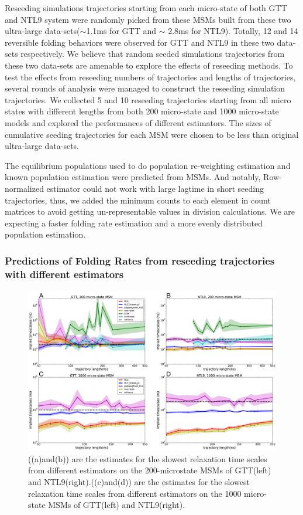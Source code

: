 \documentclass[%
 aip,
rsi,%
 amsmath,amssymb,
 reprint,%
]{revtex4-1}
\begin{document}
Reseeding simulations trajectories  starting from each micro-state of both GTT and NTL9 system were randomly picked from these MSMs built from these two ultra-large data-sets($\sim$1.1ms for GTT and $\sim$ 2.8ms for NTL9). Totally, 12 and 14 reversible folding behaviors were observed for GTT and NTL9 in these two data-sets respectively\cite{LindorffLarsen:2011gla}. We believe that random seeded simulations trajectories from these two data-sets are amenable to explore the effects of reseeding methods. To test the effects from reseeding numbers of trajectories and lengths of trajectories, several rounds of analysis were managed to construct the reseeding simulation trajectories. We collected 5 and 10 reseeding trajectories starting from all micro states with different lengths from both 200 micro-state and 1000 micro-state models and explored the performances of different estimators. The sizes of cumulative seeding trajectories for each MSM were chosen to be less than original ultra-large data-sets.

The equilibrium populations used to do population re-weighting estimation and known population estimation were predicted from MSMs. And notably, Row-normalized estimator could not work with large lagtime in short seeding trajectories, thus, we added the minimum counts to each element in count matrices to avoid getting un-representable values in division calculations. We are expecting a faster folding rate estimation and a more evenly distributed population estimation. 

\subsubsection{Predictions of Folding Rates from reseeding trajectories with different estimators}

\begin{figure}
\includegraphics[width=0.8\paperwidth]{figures/Slowest_timescales_only/all_slowest_timescales_cluster_200_and_1000_omi.pdf}
\caption{((a)and(b)) are the estimates for the slowest relaxation time scales from different estimators on the 200-microstate MSMs of GTT(left) and NTL9(right).((c)and(d)) are the estimates for the slowest relaxation time scales from different estimators on the 1000 micro-state MSMs of GTT(left) and NTL9(right).}
\end{figure}
\end{document}
